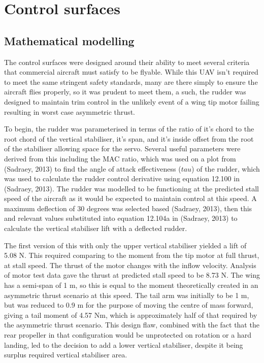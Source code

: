 \documentclass[../../main.tex]{subfiles}
\begin{document}

\section{Control surfaces} \label{sec:final-design-proposal:control-surfaces}

\subsection{Mathematical modelling} \label{sec:final-design-proposal:control-surfaces:mathematical-modelling}

The control surfaces were designed around their ability to meet several criteria that commercial aircraft must satisfy to be flyable. While this UAV isn’t required to meet the same stringent safety standards, many are there simply to ensure the aircraft flies properly, so it was prudent to meet them, a such, the rudder was designed to maintain trim control in the unlikely event of a wing tip motor failing resulting in worst case asymmetric thrust.  

To begin, the rudder was parameterised in terms of the ratio of it’s chord to the root chord of the vertical stabiliser, it’s span, and it’s inside offset from the root of the stabiliser allowing space for the servo.
Several useful parameters were derived from this including the MAC ratio, which was used on a plot from (Sadraey, 2013) to find the angle of attack effectiveness ($tau$) of the rudder, which was used to calculate the rudder control derivative using equation 12.100 in (Sadraey, 2013).
The rudder was modelled to be functioning at the predicted stall speed of the aircraft as it would be expected to maintain control at this speed.
A maximum deflection of 30 degrees was selected based (Sadraey, 2013), then this and relevant values substituted into equation 12.104a in (Sadraey, 2013) to calculate the vertical stabiliser lift with a deflected rudder. 

The first version of this with only the upper vertical stabiliser yielded a lift of 5.08 N.
This required comparing to the moment from the tip motor at full thrust, at stall speed.
The thrust of the motor changes with the inflow velocity.
Analysis of motor test data gave the thrust at predicted stall speed to be 8.73 N.
The wing has a semi-span of 1 m, so this is equal to the moment theoretically created in an asymmetric thrust scenario at this speed.
The tail arm was initially to be 1 m, but was reduced to 0.9 m for the purpose of moving the centre of mass forward, giving a tail moment of 4.57 Nm, which is approximately half of that required by the asymmetric thrust scenario.
This design flaw, combined with the fact that the rear propeller in that configuration would be unprotected on rotation or a hard landing, led to the decision to add a lower vertical stabiliser, despite it being surplus required vertical stabiliser area. 
\end{document}
